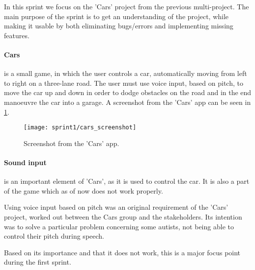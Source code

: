 In this sprint we focus on the 'Cars' project from the previous multi-project.
The main purpose of the sprint is to get an understanding of the project, while making it usable by both eliminating bugs/errors and implementing missing features.

\paragraph{Cars} is a small game, in which the user controls a car, automatically moving from left to right on a three-lane road.
The user must use voice input, based on pitch, to move the car up and down in order to dodge obstacles on the road and in the end manoeuvre the car into a garage.
A screenshot from the 'Cars' app can be seen in \cref{fig:cars_screenshot}.

\begin{figure}[h]
\centering
\texttt{[image: sprint1/cars\_screenshot]}
\caption{Screenshot from the 'Cars' app.}
\label{fig:cars_screenshot}
\end{figure}

\paragraph{Sound input} is an important element of 'Cars', as it is used to control the car.
It is also a part of the game which as of now does not work properly.

Using voice input based on pitch was an original requirement of the 'Cars' project, worked out between the Cars group and the stakeholders.
Its intention was to solve a particular problem concerning some autists, not being able to control their pitch during speech.

Based on its importance and that it does not work, this is a major focus point during the first sprint.